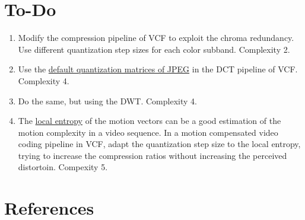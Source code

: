 \section{To-Do}
\begin{enumerate}
\item Modify the compression pipeline of VCF to exploit the chroma
  redundancy. Use different quantization step sizes for each color
  subband. Complexity 2.
\item Use the
  \href{http://www.jatit.org/volumes/Vol70No3/24Vol70No3.pdf}{default
    quantization matrices of JPEG} in the DCT pipeline of
  VCF. Complexity 4.
\item Do the same, but using the DWT. Complexity 4.
\item The
  \href{https://scikit-image.org/docs/stable/auto_examples/filters/plot_entropy.html}{local
    entropy} of the motion vectors can be a good estimation of the
  motion complexity in a video sequence. In a motion compensated video
  coding pipeline in VCF, adapt the quantization step size to the
  local entropy, trying to increase the compression ratios without
  increasing the perceived distortoin. Compexity 5.
\end{enumerate}

\section{References}

\renewcommand{\addcontentsline}[3]{}%

